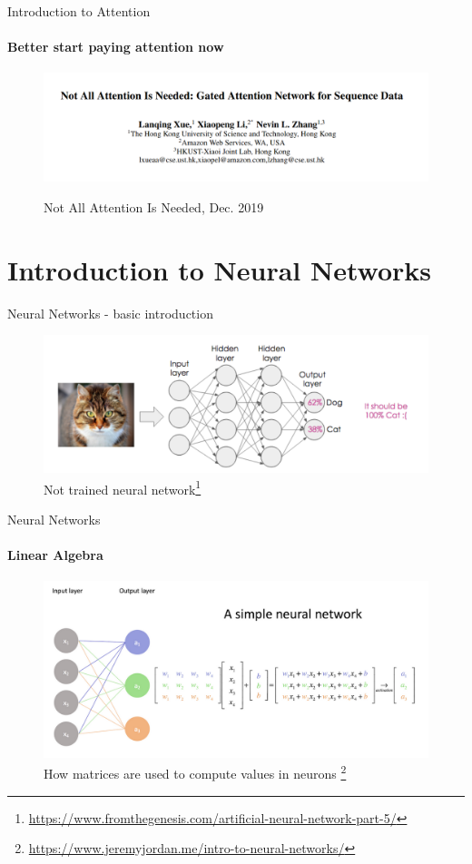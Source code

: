 \documentclass{beamer}
\begin{document}
\begin{frame}{Introduction to Attention}
\framesubtitle{Better start paying attention now}

\begin{figure}
    \centering
    \includegraphics[width = .99\textwidth]{images/gated-attention.png}
    \caption{Not All Attention Is Needed, Dec. 2019}\cite{not-all-attention-is-neededr}
\end{figure}{}

\end{frame}




\section{Introduction to Neural Networks}
\begin{frame}{Neural Networks - basic introduction}

\begin{figure}
    \centering
    \includegraphics[width = .9\textwidth]{images/cat-neural-network.png}
    \caption{Not trained neural network\footnote{\url{https://www.fromthegenesis.com/artificial-neural-network-part-5/}}}
\end{figure}{}

\end{frame}

\begin{frame}{Neural Networks}
\framesubtitle{Linear Algebra}
\begin{figure}
    \centering
    \includegraphics[width = .8\textwidth]{images/matrix.png}
    \caption{How matrices are used to compute values in neurons  \footnote{\url{https://www.jeremyjordan.me/intro-to-neural-networks/}}}
\end{figure}{}
\end{frame}
\end{document}
